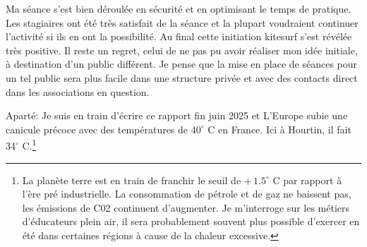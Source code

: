 \documentclass[11pt,a4paper]{report}
\begin{document}
Ma séance s'est bien déroulée en sécurité et en optimisant 
le temps de pratique. Les stagiaires ont été très satisfait de la 
séance et la plupart voudraient continuer l'activité si ils en 
ont la possibilité. 
Au final cette initiation kitesurf s'est révélée très positive.
Il reste un regret, celui de ne pas pu avoir réaliser mon idée initiale, 
à destination d'un public différent. Je pense que la mise en place de séances
pour un tel public sera plus facile dans une structure privée et avec des
contacts direct dans les associations en question.


Aparté: Je suis en train d'écrire ce rapport fin juin 2025 et L’Europe subie
une canicule précoce avec des températures de $40^{\circ}$ C en France. Ici à Hourtin, 
il fait $34^{\circ}$ C.\footnote{
La planète terre est en train de franchir le seuil  de  $+\, 1.5^{\circ}$ C par rapport
 à l'ère pré industrielle. La consommation de pétrole et de gaz ne baissent pas, les 
émissions de C02 continuent d'augmenter.
Je m'interroge sur les métiers d'éducateurs plein air, il sera
probablement souvent plus possible d'exercer en été dans certaines 
régions à cause de la chaleur excessive.}






\appendix
\appendixpage
\addappheadtotoc
\end{document}
